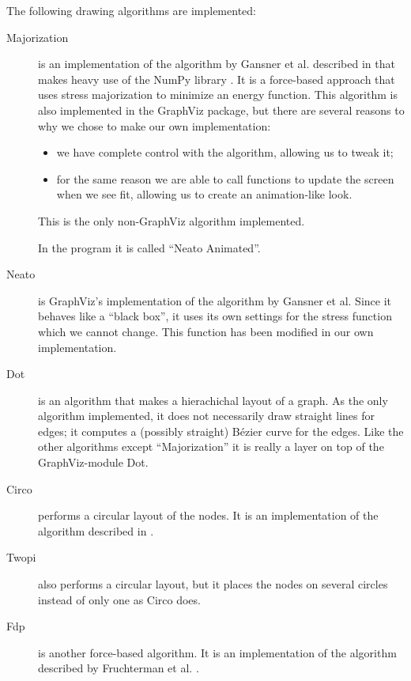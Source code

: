 The following drawing algorithms are implemented:
\begin{description}
	\item[Majorization] is an implementation of the algorithm by Gansner et al. 
	described in \cite{Gansner2004} that makes heavy use of the NumPy library \cite{NumPy}. 
	It is a force-based approach that uses stress majorization
	to minimize an energy function. This algorithm is also implemented in the GraphViz
	package, but there are several reasons to why we chose to make our own implementation:
	\begin{itemize}
		\item we have complete control with the algorithm, allowing us to tweak it;
		\item for the same reason we are able to call functions to update the screen
		when we see fit, allowing us to create an animation-like look.
	\end{itemize}
	
	This is the only non-GraphViz algorithm implemented.
	
	In the program it is called ``Neato Animated''.

	\item[Neato] is GraphViz's implementation of the algorithm by Gansner et al. 
	Since it behaves like a ``black box'', it uses its own settings for the
	stress function which we cannot change. This function has been modified in our
	own implementation.
		
	\item[Dot] is an algorithm that makes a hierachichal layout of a graph. As the only
	algorithm implemented, it does not necessarily draw straight lines for edges; it computes
	a (possibly straight) B\'ezier curve for the edges. Like the other algorithms except ``Majorization''
	it is really a layer on top of the GraphViz-module Dot.
	
	\item[Circo] performs a circular layout of the nodes. It is an implementation of 
	the algorithm described in \cite{Six1999}.
	
	\item[Twopi] also performs a circular layout, but it places the nodes on several circles instead
	of only one as Circo does. 
	
	\item[Fdp] is another force-based algorithm. It is an implementation of 
	the algorithm described by Fruchterman et al. \cite{Fruchterman1991}.
\end{description}

